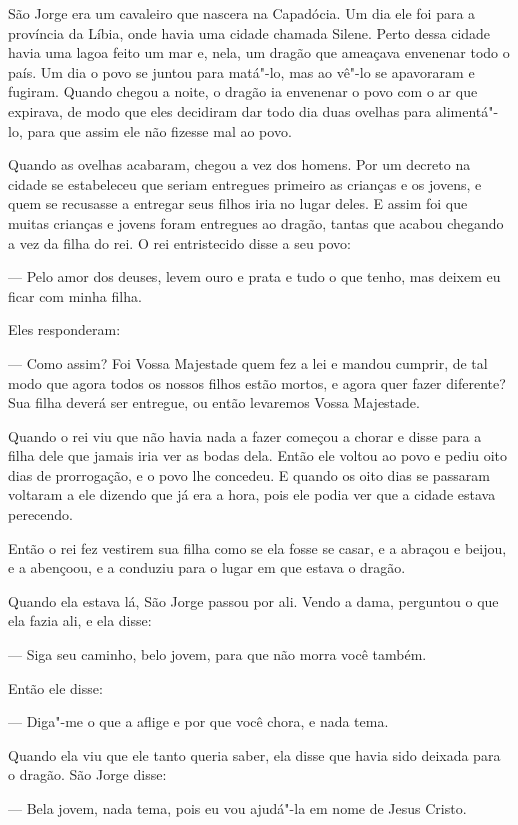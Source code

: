 São Jorge era um cavaleiro que nascera na Capadócia. Um dia ele foi
para a província da Líbia, onde havia uma cidade chamada Silene. 
Perto dessa cidade havia uma lagoa feito um mar e, nela, um dragão que
ameaçava envenenar todo o país. Um dia o povo se juntou para matá"-lo,
mas ao vê"-lo se apavoraram e fugiram. Quando chegou a noite, o
dragão ia envenenar o povo com o ar que expirava, de modo que eles
decidiram dar todo dia duas ovelhas para alimentá"-lo, para que assim
ele não fizesse mal ao povo. 

Quando as ovelhas acabaram, chegou a vez dos homens. Por um decreto
na cidade se estabeleceu que seriam entregues primeiro as crianças e
os jovens, e quem se recusasse a entregar seus filhos iria no lugar
deles. E assim foi que muitas crianças e jovens foram entregues ao
dragão, tantas que acabou chegando a vez da filha do rei. O rei
entristecido disse a seu povo:

--- Pelo amor dos deuses, levem ouro e prata e tudo o que tenho, mas
deixem eu ficar com minha filha. 

Eles responderam:

--- Como assim? Foi Vossa Majestade quem fez a lei e mandou cumprir, de
tal modo que agora todos os nossos filhos estão mortos, e agora quer
fazer diferente? Sua filha deverá ser entregue, ou então levaremos
Vossa Majestade. 

Quando o rei viu que não havia nada a fazer começou a chorar e disse
para a filha dele que jamais iria ver as bodas dela. Então ele voltou
ao povo e pediu oito dias de prorrogação, e o povo lhe concedeu. E
quando os oito dias se passaram voltaram a ele dizendo que já era a
hora, pois ele podia ver que a cidade estava perecendo.

Então o rei fez vestirem sua filha como se ela fosse se casar, e a
abraçou e beijou, e a abençoou, e a conduziu para o lugar em que
estava o dragão. 

Quando ela estava lá, São Jorge passou por ali. Vendo a dama,		
perguntou o que ela fazia ali, e ela disse:

--- Siga seu caminho, belo jovem, para que não morra você também.

Então ele disse:

--- Diga"-me o que a aflige e por que você chora, e nada tema.

Quando ela viu que ele tanto queria saber, ela disse que havia sido
deixada para o dragão. São Jorge disse:

--- Bela jovem, nada tema, pois eu vou ajudá"-la em nome de Jesus Cristo.



